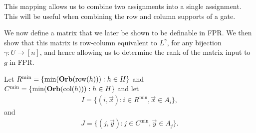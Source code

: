 \documentclass[12pt]{report}
\newtheorem{lem}[thm]{Lemma} \newtheorem{prop}[thm]{Proposition}
\newcommand{\stab}{\text{\textbf{Stab}}}
\newcommand{\orb}{\text{\textbf{Orb}}}
\newcommand{\consp}{\text{sp}}
\newcommand{\row}{\text{row}}
\newcommand{\column}{\text{col}}
\newcommand{\EV}{\text{EV}}
\newcommand{\types}{\text{types}}
\newcommand{\spstab}[1]{\stab (\consp (#1))}
\begin{document}
This mapping allows us to combine two assignments into a single assignment. This
will be useful when combining the row and column supports of a gate.






We now define a matrix that we later be shown to be definable in FPR. We then
show that this matrix is row-column equivalent to $L^{\gamma}$, for any
bijection $\gamma: U \rightarrow [n]$, and hence allowing us to determine the
rank of the matrix input to $g$ in FPR.

Let $R^{\min} = \{\min (\orb(\row(h))) : h \in H\}$ and $C^{\min} = \{ \min
(\orb (\column(h))) : h \in H\}$ and let
\begin{align*}
  I = \{(i, \vec{x}): i \in R^{\min}, \vec{x} \in A_i\},
\end{align*}
and
\begin{align*}
  J = \{(j, \vec{y}): j \in C^{\min}, \vec{y} \in A_j \}.
\end{align*}

\end{document}
